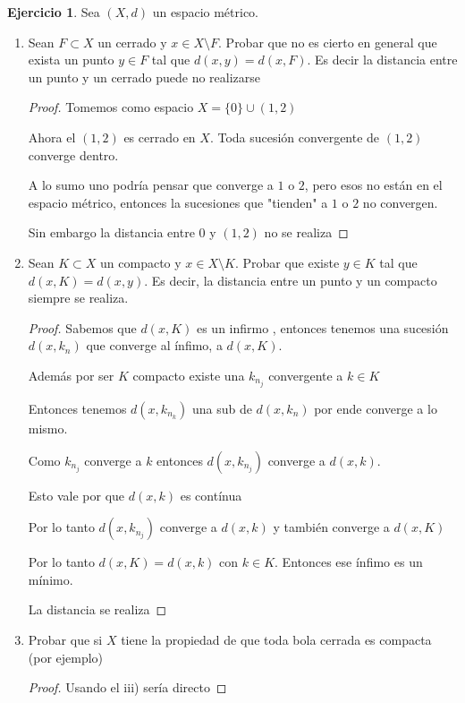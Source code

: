 \documentclass[11pt]{report}
\theoremstyle{definition}
\newtheorem{ej}{Ejercicio}
\begin{document}
	\begin{ej}
		Sea $(X,d)$ un espacio métrico.
		\begin{enumerate}
			\item Sean $F \subset X$ un cerrado y $x \in X\setminus F$. Probar que no es cierto en general que exista un punto $y \in F$ tal que $d(x,y) = d(x,F)$. Es decir la distancia entre un punto y un cerrado puede no realizarse 
				\begin{proof}
					Tomemos como espacio $X = \{0\} \cup (1,2)$

					Ahora el $(1,2)$ es cerrado en $X$. Toda sucesión convergente de $(1,2)$ converge dentro.
					
					A lo sumo uno podría pensar que converge a $1$ o $2$, pero esos no están en el espacio métrico, entonces la sucesiones que "tienden" a $1$ o $2$ no convergen.

					Sin embargo la distancia entre $0$ y $(1,2)$ no se realiza

				\end{proof}
			\item Sean $K\subset X$ un compacto y $x \in X \setminus K$. Probar que existe $y \in K$ tal que $d(x,K) = d(x,y)$. Es decir, la distancia entre un punto y un compacto siempre se realiza.
				\begin{proof}
					Sabemos que $d(x,K)$ es un infirmo , entonces tenemos una sucesión $d(x,k_n)$ que converge al ínfimo, a $d(x,K)$.

					Además por ser $K$ compacto existe una $k_{n_j}$ convergente a $k \in K$

					Entonces tenemos $d(x,k_{n_k})$ una sub de $d(x,k_n)$ por ende converge a lo mismo.

					Como $k_{n_j}$ converge a $k$ entonces $d(x,k_{n_j})$ converge a $d(x,k)$. 

					Esto vale por que $d(x,k)$ es contínua 	

					Por lo tanto $d(x,k_{n_j})$ converge a $d(x,k)$ y también converge a $d(x,K)$

					Por lo tanto $d(x,K) = d(x,k)$ con $k \in K$. Entonces ese ínfimo es un mínimo.

					La distancia se realiza
					
				\end{proof}
			\item Probar que si $X$ tiene la propiedad de que toda bola cerrada es compacta (por ejemplo)
				\begin{proof}
					Usando el iii) sería directo
				\end{proof}
				

\end{enumerate}
\end{ej}
\end{document}
